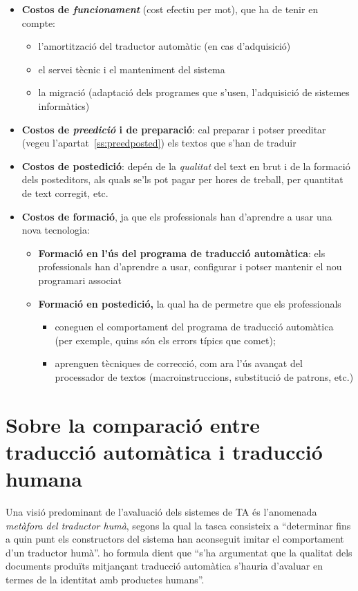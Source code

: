   \begin{itemize}
  \item \textbf{Costos de \emph{funcionament}} (cost efectiu per mot),
    que ha de tenir en compte:
    \begin{itemize}
    \item l'amortització del traductor automàtic (en cas d'adquisició)
    \item el servei tècnic i el manteniment del sistema
    \item la migració (adaptació dels programes que s'usen,
      l'adquisició de sistemes informàtics)
    \end{itemize}

  \item \textbf{Costos de \emph{preedició} i de preparació}: cal
    preparar i potser preeditar (vegeu l'apartat~\ref{ss:preedposted})
    els textos que s'han de traduir

  \item \textbf{Costos de postedició}: depén de la \emph{qualitat} del
    text en brut i de la formació dels posteditors, als quals se'ls
    pot pagar per hores de treball, per quantitat de text corregit,
    etc.

  \item \textbf{Costos de formació}, ja que els professionals han
    d'aprendre a usar una nova tecnologia:
    \begin{itemize}
    \item \textbf{Formació en l'ús del programa de traducció
        automàtica}: els professionals han d'aprendre a usar,
      configurar i potser mantenir el nou programari associat
    \item \textbf{Formació en postedició,} la qual ha de permetre que
      els professionals
      \begin{itemize}
      \item coneguen el comportament del programa de traducció
        automàtica (per exemple, quins són els errors típics que
        comet);
      \item aprenguen tècniques de correcció, com ara l'ús avançat del
        processador de textos (macroinstruccions, substitució de
        patrons, etc.)
      \end{itemize}
    \end{itemize}
  \end{itemize}


  \section[Traducció automàtica i traducció humana]{Sobre la
    comparació entre traducció auto\-mà\-tica i traducció humana}
\label{ss:humaut}
Una visió predominant de l'avaluació dels sistemes de TA és
l'anomenada \emph{metàfora del traductor humà}, segons la qual
\citep{krauwer93j} la tasca consisteix a ``determinar fins a quin punt
els constructors del sistema han aconseguit imitar el comportament
d'un traductor humà''. \citet[p.~262]{sager93b} ho formula dient que
``s'ha argumentat que la qualitat dels documents produïts mitjançant
traducció automàtica s'hauria d'avaluar en termes de la identitat amb
productes humans''.
  

